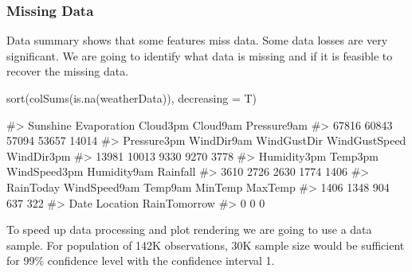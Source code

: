 \hypertarget{missing-data}{%
\subsubsection{Missing Data}\label{missing-data}}

Data summary shows that some features miss data. Some data losses are
very significant. We are going to identify what data is missing and if
it is feasible to recover the missing data.

\begin{Schunk}
\begin{Sinput}
sort(colSums(is.na(weatherData)), decreasing = T)
\end{Sinput}
\begin{Soutput}
#>      Sunshine   Evaporation      Cloud3pm      Cloud9am   Pressure9am 
#>         67816         60843         57094         53657         14014 
#>   Pressure3pm    WindDir9am   WindGustDir WindGustSpeed    WindDir3pm 
#>         13981         10013          9330          9270          3778 
#>   Humidity3pm       Temp3pm  WindSpeed3pm   Humidity9am      Rainfall 
#>          3610          2726          2630          1774          1406 
#>     RainToday  WindSpeed9am       Temp9am       MinTemp       MaxTemp 
#>          1406          1348           904           637           322 
#>          Date      Location  RainTomorrow 
#>             0             0             0
\end{Soutput}
\end{Schunk}

To speed up data processing and plot rendering we are going to use a
data sample. For population of 142K observations, 30K sample size would
be sufficient for 99\% confidence level with the confidence interval 1.

